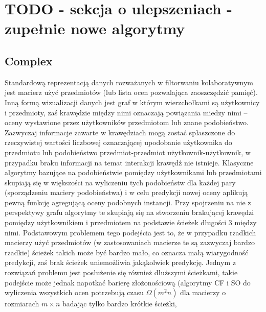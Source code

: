 \documentclass{pracamgr}
\begin{document}
  \section{TODO - sekcja o ulepszeniach - zupełnie nowe algorytmy}
   \subsection{Complex}
    Standardową reprezentacją danych rozważanych w filtorwaniu kolaboratywnym jest macierz użyć przedmiotów (lub lista ocen pozwalająca zaoszczędzić pamięć).
    Inną formą wizualizacji danych jest graf w którym wierzchołkami są użytkownicy i przedmioty, zaś krawędzie między nimi oznaczają powiązania miedzy nimi
    -- oceny wystawione przez użytkowników przedmiotom lub znane podobieństwo. Zazwyczaj informacje zawarte w krawędziach mogą zostać spłaszczone do
    rzeczywistej wartości liczbowej oznaczającej upodobanie użytkownika do przedmiotu lub podobieństwo przedmiot-przedmiot użytkownik-użytkownik,
    w przypadku braku informacji na temat interakcji krawędź nie istnieje.
    Klasyczne algorytmy bazujące na podobieństwie pomiędzy użytkownikami lub przedmiotami skupiają się w większości na wyliczeniu tych podobieństw
    dla każdej pary (sporządzeniu maciery podobieństwa) i w celu predykcji nowej oceny aplikują pewną funkcję agregującą oceny podobnych instancji.
    Przy spojrzeniu na nie z perspektywy grafu algorytmy te skupiają się na stworzeniu brakującej krawędzi pomiędzy użytkownikiem i przedmiotem na podstawie
    ścieżek długości 3 między nimi.\newline
    Podstawowym problemem tego podejścia jest to, że w przypadku rzadkich macierzy użyć przedmiotów (w zastosowaniach macierze te są zazwyczaj bardzo rzadkie)
    ścieżek takich może być bardzo mało, co oznacza małą wiarygodność predykcji, zaś brak ścieżek uniemożliwia jakąkolwiek predykcję.
    Jednym z rozwiązań problemu jest posłużenie się również dłuższymi ścieżkami, takie podejście może jednak napotkać barierę złożonościową
    (algorytmy CF i SO do wyliczenia wszystkich ocen potrzebują czasu $\Omega(m^2n)$ dla macierzy o rozmiarach $m\times n$ badając tylko bardzo krótkie ścieżki,
\end{document}
